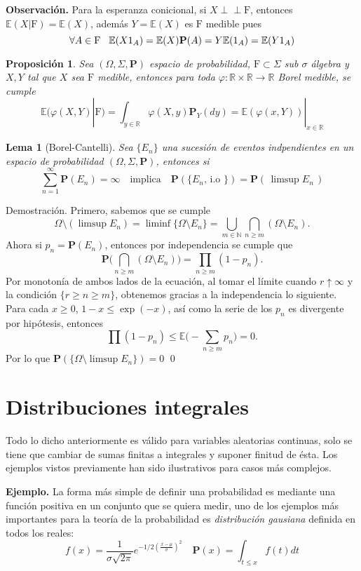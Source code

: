 \documentclass[letterpaper]{book}
\newcommand{\ind}{\perp\!\!\!\!\perp}
\newtheorem{prop}[teorema]{Proposici\'on}
\newtheorem{lema}[teorema]{Lema}
\newcommand{\nat}{\ensuremath{ \mathbb N }}
\newcommand{\prob}{\textbf{P}}
\newcommand{\esp}{\mathbb E}
\newcommand{\exe}{{\newline \noindent \sc \textbf{Ejemplo. }}}
\newcommand{\obs}{{\newline \noindent \sc \textbf{Observación. }}}
\newcommand{\dem}{{\noindent \sc Demostraci\'on. }}
\newcommand{\om}{\ensuremath{\Omega}}
\newcommand{\sig}{\ensuremath{\Sigma}}
\newcommand{\re}{\ensuremath{\mathbb R }}
\begin{document}
\obs Para la esperanza conicional, si \(X \ind\mathrm{F}\), entonces \(\esp(X|\mathrm{F})=\esp(X)\), además \(Y=\esp(X)\) es \(\mathrm{F}\) medible pues
\[
    \forall A\in\mathrm{F}\hspace{0.3cm}\esp(X1_A)=\esp(X)\prob(A)=Y\esp(1_A)=\esp(Y1_A)
\]
\begin{prop}
Sea $(\om,\sig,\prob)$ espacio de probabilidad, $\mathrm{F}\subset\sig$ sub $\sigma$ álgebra y $X,Y$  tal que $X$ sea $\mathrm{F}$ medible, entonces para toda $\varphi:\re\times\re\rightarrow\re$ Borel medible, se cumple
\[
\esp(\varphi(X,Y)|\mathrm{F})=\int_{y\in\re}\varphi(X,y)\prob_Y(dy)=\esp(\varphi(x,Y))|_{x\in\re}
\]
\end{prop}
\begin{lema}[Borel-Cantelli]\label{bor-can}
Sea $\{E_n\}$ una sucesión de eventos indpendientes en un espacio de probabilidad $(\om,\sig,\prob)$, entonces si
\begin{equation}
\sum_{n=1}^{\infty}\prob(E_n)=\infty\quad\text{implica}\quad\prob(\{E_n,\,\text{i.o }\})=\prob(\,\limsup E_n\,)
\end{equation}
\end{lema}
\dem Primero, sabemos que se cumple
\[
    \om\setminus(\limsup E_n)=\liminf \{\om\setminus E_n\}=\bigcup_{m\in\nat}\bigcap_{n\geq m}(\om\setminus E_n).
\]
\noindent Ahora si \(p_n=\prob(E_n)\), entonces por independencia se cumple que
\[
    \prob\Big(\bigcap_{n\geq m}(\om\setminus E_n)\Big)=\prod_{n\geq m}(1-p_n).
\]
Por monotonía de ambos lados de la ecuación, al tomar el límite cuando \(r\uparrow\infty\) y la condición \(\{r\geq n\geq m\}\), obtenemos gracias a la independencia lo siguiente. Para cada \(x\geq 0\), \(1-x\leq\exp(-x)\), así como la serie de los \(p_n\) es divergente por hipótesis, entonces
\[
    \prod(1-p_n)\leq\esp\Big(-\sum_{n\geq m}p_n\Big)=0.
\]
\noindent Por lo que \(\prob(\{\om\setminus\limsup E_n\})=0\) \qed
\section{Distribuciones integrales}
\label{sec:org8cc3821}

\noindent Todo lo dicho anteriormente es válido para variables aleatorias continuas, solo se tiene que cambiar de sumas finitas a integrales y suponer finitud de ésta. Los ejemplos vistos previamente han sido ilustrativos para casos más complejos.

\exe La forma más simple de definir una probabilidad es mediante una función positiva en un conjunto que se quiera medir, uno de los ejemplos más importantes para la teoría de la probabilidad es \emph{distribución gausiana} definida en todos los reales:
\[
    f(x)=\frac{1}{\sigma\sqrt{2\pi}}e^{-1/2(\frac{x-\mu}{\sigma})^2}\quad \prob(x)=\int_{t\leq x}f(t)dt
\]
\end{document}
